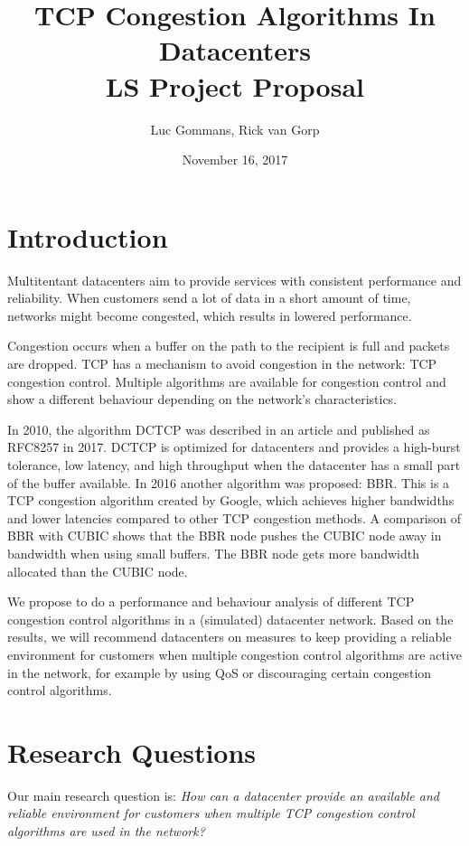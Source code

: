 \documentclass{article}
\title{TCP Congestion Algorithms In Datacenters \\
	\vspace{0.3cm}
	{\large LS Project Proposal}
}
\date{November 16, 2017}
\author{Luc Gommans, Rick van Gorp}
\begin{document}
\maketitle

\section{Introduction}

Multitentant datacenters aim to provide services with consistent performance
and reliability. When customers send a lot of data in a short amount of time,
networks might become congested, which results in lowered performance.

Congestion occurs when a buffer on the path to the recipient is full and
packets are dropped. TCP has a mechanism to avoid congestion in the network:
TCP congestion control. Multiple algorithms are available for congestion
control and show a different behaviour depending on the network's
characteristics.

In 2010, the algorithm DCTCP was described in an
article\cite{dctcp-congestion-original} and published as RFC8257 in
2017\cite{dctcp-congestion}. DCTCP is optimized for datacenters and provides a
high-burst tolerance, low latency, and high throughput when the datacenter has
a small part of the buffer available\cite{dctcp-congestion}. In 2016 another
algorithm was proposed: BBR. This is a TCP congestion algorithm created by
Google, which achieves higher bandwidths and lower latencies compared to other
TCP congestion methods\cite{bbr-congestion}. A comparison of BBR with
CUBIC\cite{bbr-congestion-comparison} shows that the BBR node pushes the CUBIC
node away in bandwidth when using small buffers. The BBR node gets more
bandwidth allocated than the CUBIC node.

We propose to do a performance and behaviour analysis of different TCP
congestion control algorithms in a (simulated) datacenter network. Based on the
results, we will recommend datacenters on measures to keep providing a reliable
environment for customers when multiple congestion control algorithms are
active in the network, for example by using QoS or discouraging certain
congestion control algorithms.


\section{Research Questions}

Our main research question is:
{\it How can a datacenter provide an available and reliable environment for
customers when multiple TCP congestion control algorithms are used in the
network?}
\end{document}
